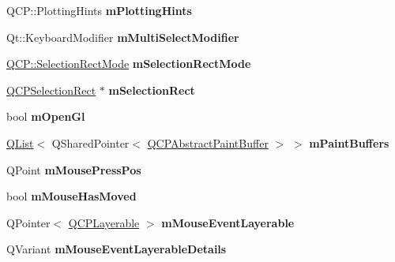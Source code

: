 \begin{DoxyCompactItemize}
Q\+C\+P\+::\+Plotting\+Hints {\bfseries m\+Plotting\+Hints}
\item 
\mbox{\label{class_q_custom_plot_a0e97e701c5671e7e463d2ce0211d0f8a}} 
Qt\+::\+Keyboard\+Modifier {\bfseries m\+Multi\+Select\+Modifier}
\item 
\mbox{\label{class_q_custom_plot_abe04c5def373cc4fede8de20542ca3f2}} 
\hyperlink{namespace_q_c_p_ac9aa4d6d81ac76b094f9af9ad2d3aacf}{Q\+C\+P\+::\+Selection\+Rect\+Mode} {\bfseries m\+Selection\+Rect\+Mode}
\item 
\mbox{\label{class_q_custom_plot_abbc157c3f4f0e555c671dce123b178d6}} 
\hyperlink{class_q_c_p_selection_rect}{Q\+C\+P\+Selection\+Rect} $\ast$ {\bfseries m\+Selection\+Rect}
\item 
\mbox{\label{class_q_custom_plot_a0841dbea13bd120d20e3f0cc36767ff9}} 
bool {\bfseries m\+Open\+Gl}
\item 
\mbox{\label{class_q_custom_plot_a8907ada9d001456fa37ddd8fd7cb09a3}} 
\hyperlink{class_q_list}{Q\+List}$<$ Q\+Shared\+Pointer$<$ \hyperlink{class_q_c_p_abstract_paint_buffer}{Q\+C\+P\+Abstract\+Paint\+Buffer} $>$ $>$ {\bfseries m\+Paint\+Buffers}
\item 
\mbox{\label{class_q_custom_plot_ac57090da95056ae4dd67be67adfa85bd}} 
Q\+Point {\bfseries m\+Mouse\+Press\+Pos}
\item 
\mbox{\label{class_q_custom_plot_ad2108936f001a8be5974b0b6ff13dae3}} 
bool {\bfseries m\+Mouse\+Has\+Moved}
\item 
\mbox{\label{class_q_custom_plot_a93a81f6dba7ee8ba2d71f346034716cc}} 
Q\+Pointer$<$ \hyperlink{class_q_c_p_layerable}{Q\+C\+P\+Layerable} $>$ {\bfseries m\+Mouse\+Event\+Layerable}
\item 
\mbox{\label{class_q_custom_plot_ad604958ef16fc022c474521a08d88a2d}} 
Q\+Variant {\bfseries m\+Mouse\+Event\+Layerable\+Details}
\item 
\mbox{\label{class_q_custom_plot_ab30daeca6612c3948afd368dce5f1c39}} 

\end{DoxyCompactItemize}

